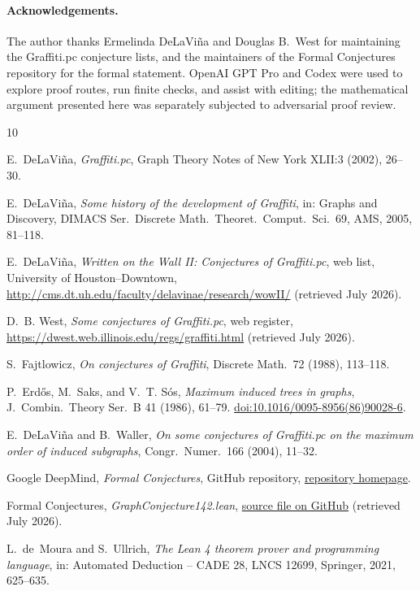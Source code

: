\documentclass[11pt]{article}
\numberwithin{equation}{section}
\theoremstyle{remark}
\begin{document}
\paragraph{Acknowledgements.}
The author thanks Ermelinda DeLaVi\~na and Douglas B.\ West for maintaining
the Graffiti.pc conjecture lists, and the maintainers of the Formal
Conjectures repository for the formal statement.  OpenAI GPT Pro and Codex
were used to explore proof routes, run finite checks, and assist with editing;
the mathematical argument presented here was separately subjected to
adversarial proof review.

\begin{thebibliography}{10}

E.~DeLaVi\~na,
\emph{Graffiti.pc},
Graph Theory Notes of New York XLII:3 (2002), 26--30.

E.~DeLaVi\~na,
\emph{Some history of the development of Graffiti},
in: Graphs and Discovery, DIMACS Ser.\ Discrete Math.\ Theoret.\ Comput.\
Sci.\ 69, AMS, 2005, 81--118.

E.~DeLaVi\~na,
\emph{Written on the Wall II: Conjectures of Graffiti.pc},
web list, University of Houston--Downtown,
\url{http://cms.dt.uh.edu/faculty/delavinae/research/wowII/}
(retrieved July 2026).

D.~B. West,
\emph{Some conjectures of Graffiti.pc}, web register,
\url{https://dwest.web.illinois.edu/regs/graffiti.html}
(retrieved July 2026).

S.~Fajtlowicz,
\emph{On conjectures of Graffiti},
Discrete Math.\ 72 (1988), 113--118.

P.~Erd\H{o}s, M.~Saks, and V.~T. S\'os,
\emph{Maximum induced trees in graphs},
J.~Combin.\ Theory Ser.\ B 41 (1986), 61--79.
\href{https://doi.org/10.1016/0095-8956(86)90028-6}
{doi:10.1016/0095-8956(86)90028-6}.

E.~DeLaVi\~na and B.~Waller,
\emph{On some conjectures of Graffiti.pc on the maximum order of induced
subgraphs},
Congr.\ Numer.\ 166 (2004), 11--32.

Google DeepMind,
\emph{Formal Conjectures}, GitHub repository,
\href{https://github.com/google-deepmind/formal-conjectures}{repository homepage}.

Formal Conjectures,
\emph{GraphConjecture142.lean},
\href{https://github.com/google-deepmind/formal-conjectures/blob/main/FormalConjectures/WrittenOnTheWallII/GraphConjecture142.lean}{source file on GitHub}
(retrieved July 2026).

L.~de~Moura and S.~Ullrich,
\emph{The Lean 4 theorem prover and programming language},
in: Automated Deduction -- CADE 28, LNCS 12699, Springer, 2021, 625--635.

\end{thebibliography}
\end{document}
